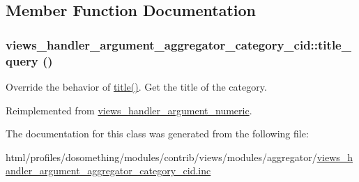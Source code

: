 \subsection{Member Function Documentation}
\hypertarget{classviews__handler__argument__aggregator__category__cid_aaaf79328b4ec709281563e275f9a7df2}{
\subsubsection[{title\_\-query}]{\setlength{\rightskip}{0pt plus 5cm}views\_\-handler\_\-argument\_\-aggregator\_\-category\_\-cid::title\_\-query ()}}
\label{classviews__handler__argument__aggregator__category__cid_aaaf79328b4ec709281563e275f9a7df2}
Override the behavior of \hyperlink{classviews__handler__argument__numeric_a480758dbcde899b5483b091e51e2bf39}{title()}. Get the title of the category. 

Reimplemented from \hyperlink{classviews__handler__argument__numeric_a5c6f566b06bad6057e92f15d82311c7b}{views\_\-handler\_\-argument\_\-numeric}.

The documentation for this class was generated from the following file:\begin{DoxyCompactItemize}
\item 
html/profiles/dosomething/modules/contrib/views/modules/aggregator/\hyperlink{views__handler__argument__aggregator__category__cid_8inc}{views\_\-handler\_\-argument\_\-aggregator\_\-category\_\-cid.inc}\end{DoxyCompactItemize}

